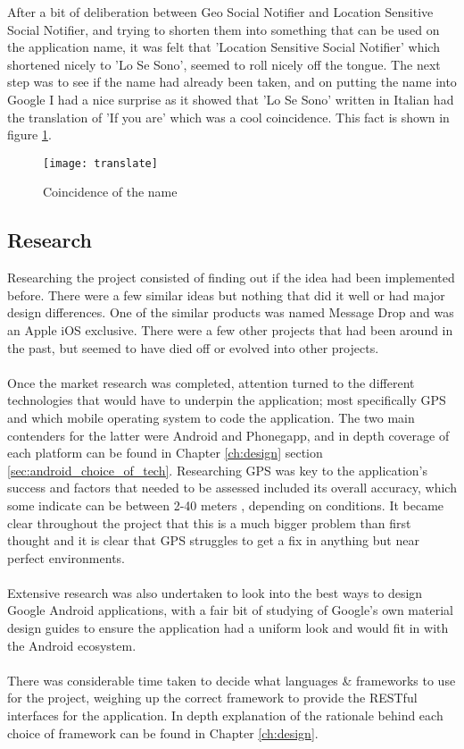 \noindent
After a bit of deliberation between Geo Social Notifier and Location Sensitive Social Notifier, and trying to shorten them into something that can be used on the application name, it was felt that 'Location Sensitive Social Notifier' which shortened nicely to 'Lo Se Sono', seemed to roll nicely off the tongue. The next step was to see if the name had already been taken, and on putting the name into Google I had a nice surprise as it showed that 'Lo Se Sono' written in Italian had the translation of 'If you are' which was a cool coincidence. This fact is shown in figure \ref{fig:google_translate}.

\begin{figure}[H]
    \centering
    \texttt{[image: translate]}
    \caption{Coincidence of the name}
    \label{fig:google_translate}
\end{figure} 

\subsection{Research}

Researching the project consisted of finding out if the idea had been implemented before. There were a few similar ideas but nothing that did it well or had major design differences. One of the similar products was named Message Drop \cite{dmt:dropmessageteam:2015:online} and was an Apple iOS exclusive. There were a few other projects that had been around in the past, but seemed to have died off or evolved into other projects.\\
\\
Once the market research was completed, attention turned to the different technologies that would have to underpin the application; most specifically GPS and which mobile operating system to code the application. The two main contenders for the latter were Android and Phonegapp, and in depth coverage of each platform can be found in Chapter \ref{ch:design} section \ref{sec:android_choice_of_tech}. Researching GPS was key to the application's success and factors that needed to be assessed included its overall accuracy, which some indicate can be between 2-40 meters \cite{DevdattaTengshe:gpsacuracy:2012:online}, depending on conditions. It became clear throughout the project that this is a much bigger problem than first thought and it is clear that GPS struggles to get a fix in anything but near perfect environments.\\
\\
Extensive research was also undertaken to look into the best ways to design Google Android applications, with a fair bit of studying of Google's own material design guides to ensure the application had a uniform look and would fit in with the Android ecosystem.\\
\\
There was considerable time taken to decide what languages \& frameworks to use for the project, weighing up the correct framework to provide the RESTful interfaces for the application. In depth explanation of the rationale behind each choice of framework can be found in Chapter \ref{ch:design}.

